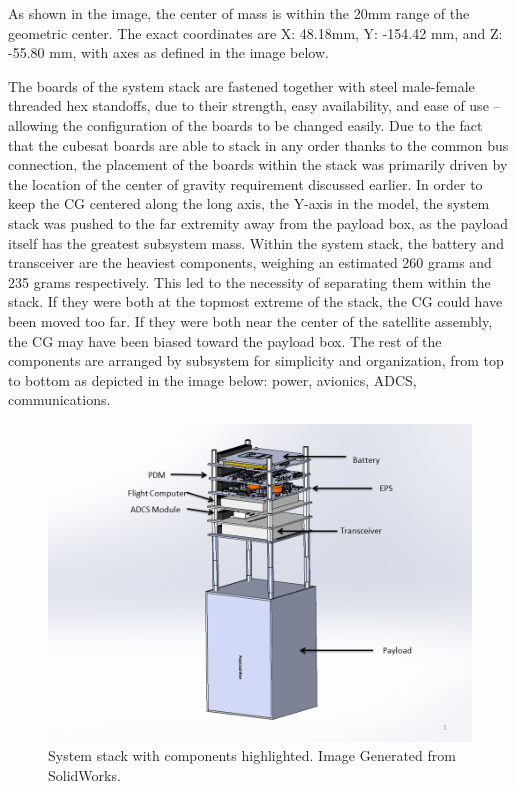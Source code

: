 \documentclass[12pt]{article}
\begin{document}
As shown in the image, the center of mass is within the 20mm range of the geometric center. The exact coordinates are X: 48.18mm, Y: -154.42 mm, and Z: -55.80 mm, with axes as defined in the image below.

The boards of the system stack are fastened together with steel male-female threaded hex standoffs, due to their strength, easy availability, and ease of use – allowing the configuration of the boards to be changed easily. Due to the fact that the cubesat boards are able to stack in any order thanks to the common bus connection, the placement of the boards within the stack was primarily driven by the location of the center of gravity requirement discussed earlier. In order to keep the CG centered along the long axis, the Y-axis in the model, the system stack was pushed to the far extremity away from the payload box, as the payload itself has the greatest subsystem mass. Within the system stack, the battery and transceiver are the heaviest components, weighing an estimated 260 grams and 235 grams respectively. This led to the necessity of separating them within the stack. If they were both at the topmost extreme of the stack, the CG could have been moved too far. If they were both near the center of the satellite assembly, the CG may have been biased toward the payload box.  The rest of the components are arranged by subsystem for simplicity and organization, from top to bottom as depicted in the image below: power, avionics, ADCS, communications.

\begin{figure}[!ht]
\centering
\includegraphics[width=6in]{images/STR-8.png}
\caption{System stack with components highlighted. Image Generated from SolidWorks.}
\label{fig:str-8}
\end{figure}
\end{document}

